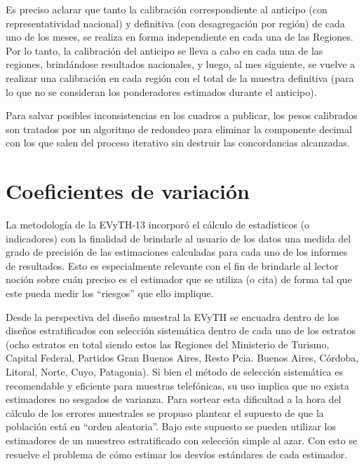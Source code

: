 \documentclass[
  openany]{book}
\begin{document}
Es preciso aclarar que tanto la calibración correspondiente al anticipo (con representatividad nacional) y definitiva (con desagregación por región) de cada uno de los meses, se realiza en forma independiente en cada una de las Regiones. Por lo tanto, la calibración del anticipo se lleva a cabo en cada una de las regiones, brindándose resultados nacionales, y luego, al mes siguiente, se vuelve a realizar una calibración en cada región con el total de la muestra definitiva (para lo que no se consideran los ponderadores estimados durante el anticipo).

Para salvar posibles inconsistencias en los cuadros a publicar, los pesos calibrados son tratados por un algoritmo de redondeo para eliminar la componente decimal con los que salen del proceso iterativo sin destruir las concordancias alcanzadas.

\hypertarget{coeficientes-de-variaciuxf3n}{%
\section{Coeficientes de variación}\label{coeficientes-de-variaciuxf3n}}

La metodología de la EVyTH-13 incorporó el cálculo de estadísticos (o indicadores) con la finalidad de brindarle al usuario de los datos una medida del grado de precisión de las estimaciones calculadas para cada uno de los informes de resultados. Esto es especialmente relevante con el fin de brindarle al lector noción sobre cuán preciso es el estimador que se utiliza (o cita) de forma tal que este pueda medir los ``riesgos'' que ello implique.

Desde la perspectiva del diseño muestral la EVyTH se encuadra dentro de los diseños estratificados con selección sistemática dentro de cada uno de los estratos (ocho estratos en total siendo estos las Regiones del Ministerio de Turismo, Capital Federal, Partidos Gran Buenos Aires, Resto Pcia. Buenos Aires, Córdoba, Litoral, Norte, Cuyo, Patagonia). Si bien el método de selección sistemática es recomendable y eficiente para muestras telefónicas, su uso implica que no exista estimadores no sesgados de varianza. Para sortear esta dificultad a la hora del cálculo de los errores muestrales se propuso plantear el supuesto de que la población está en ``orden aleatoria''. Bajo este supuesto se pueden utilizar los estimadores de un muestreo estratificado con selección simple al azar. Con esto se resuelve el problema de cómo estimar los desvíos estándares de cada estimador.
\end{document}
